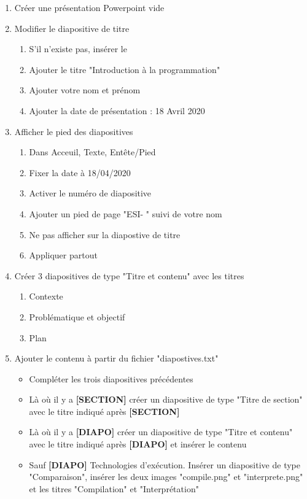 \documentclass[11pt, a4paper]{article}
\begin{document}
\begin{enumerate}
	\item Créer une présentation Powerpoint vide 
	\item Modifier le diapositive de titre 
	\begin{multicols}{3}
	\begin{enumerate}
		\item S'il n'existe pas, insérer le
		\item Ajouter le titre "Introduction à la programmation"
		\item Ajouter votre nom et prénom 
		\item Ajouter la date de présentation : 18 Avril 2020
	\end{enumerate}
	\end{multicols}

	\item Afficher le pied des diapositives 
	\begin{multicols}{3}
	\begin{enumerate}
		\item Dans Acceuil, Texte, Entête/Pied
		\item Fixer la date à 18/04/2020
		\item Activer le numéro de diapositive
		\item Ajouter un pied de page "ESI- " suivi de votre nom
		\item Ne pas afficher sur la diapostive de titre
		\item Appliquer partout
	\end{enumerate}
	\end{multicols}
	
	\item Créer 3 diapositives de type "Titre et contenu" avec les titres
	\begin{multicols}{3}
	\begin{enumerate}
		\item Contexte
		\item Problématique et objectif
		\item Plan
	\end{enumerate} 
	\end{multicols}
	
	\item Ajouter le contenu à partir du fichier "diapostives.txt"
	\begin{itemize}
		\item Compléter les trois diapositives précédentes
		\item Là où il y a \textbf{[SECTION]} créer un diapositive de type "Titre de section" avec le titre indiqué après \textbf{[SECTION]}
		\item Là où il y a \textbf{[DIAPO]} créer un diapositive de type "Titre et contenu" avec le titre indiqué après \textbf{[DIAPO]} et insérer le contenu
		\item Sauf \textbf{[DIAPO]} Technologies d'exécution. Insérer un diapositive de type "Comparaison", insérer les deux images "compile.png" et "interprete.png" et les titres "Compilation" et "Interprétation"
	\end{itemize}
	

\end{enumerate}
\end{document}
